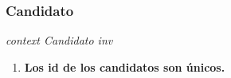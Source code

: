 \subsubsection*{Candidato}

\textit{context Candidato
inv}

\begin{enumerate}
\item \textbf{Los id de los candidatos son únicos.}
\end{enumerate}
